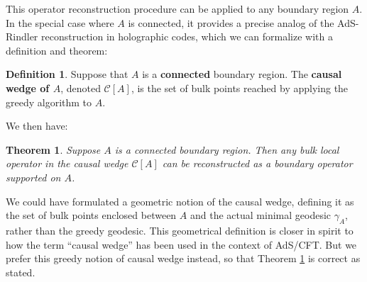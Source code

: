 \documentclass[12pt]{article}
\theoremstyle{plain}
\newtheorem{theorem}{Theorem}
\theoremstyle{plain}
\theoremstyle{plain}
\theoremstyle{plain}
\theoremstyle{result}
\theoremstyle{remark}
\theoremstyle{conjecture}
\theoremstyle{observation}
\theoremstyle{definition}
\theoremstyle{corollary}
\theoremstyle{definition}
\theoremstyle{definition}
\newtheorem{definition}{Definition}
\theoremstyle{assumption}
\theoremstyle{definition}
\theoremstyle{problem}
\theoremstyle{fact}
\newcommand{\CA}{\mathcal{C}[A]}
\begin{document}
This operator reconstruction procedure can be applied to any boundary region $A$. In the special case where $A$ is connected, it provides a precise analog of the AdS-Rindler reconstruction in holographic codes, which we can formalize with a definition and theorem:
\begin{definition}
Suppose that $A$ is a {\bf connected} boundary region.  The \textbf{causal wedge of $A$}, denoted $\CA$, is the set of bulk points reached by applying the greedy algorithm to $A$.  
\end{definition}
\noindent We then have:
\begin{theorem}\label{theorem:causal-wedge}
Suppose $A$ is a connected boundary region.  Then any bulk local operator in the causal wedge $\CA$ can be reconstructed as a boundary operator supported on $A$.  
\end{theorem}

\noindent We could have formulated a geometric notion of the causal wedge, defining it as the set of bulk points enclosed between $A$ and the actual minimal geodesic $\gamma_A$, rather than the greedy geodesic. This geometrical definition is closer in spirit to how the term ``causal wedge'' has been used in the context of AdS/CFT. But we prefer this greedy notion of causal wedge instead, so that Theorem \ref{theorem:causal-wedge} is correct as stated. 
\end{document}

